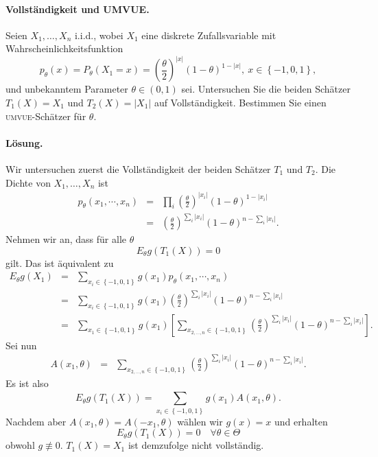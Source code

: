 \paragraph{Vollständigkeit und UMVUE. }  Seien $X_1,\ldots,X_n$ i.i.d.,
wobei $X_1$ eine diskrete Zufallsvariable mit Wahrscheinlichkeitsfunktion
\begin{equation}
	p_\theta(x)=P_\theta(X_1=x)= 
	\left( \frac{\theta}{2} \right)^{|x|} (1-\theta)^{1-|x|},\  
	x\in\left\{ -1,0,1 \right\},
\end{equation}
und unbekanntem Parameter $\theta\in (0,1)$ sei. Untersuchen Sie die beiden
Schätzer $T_1(X)=X_1$ und $T_2(X)=|X_1|$ auf Vollständigkeit. Bestimmen Sie
einen \textsc{umvue}-Schätzer für $\theta$.

\paragraph*{Lösung. } 
Wir untersuchen zuerst die Vollständigkeit der beiden Schätzer $T_1$ und $T_2$. 
Die Dichte von $X_1,\ldots,X_n$ ist
\begin{eqnarray}
	p_\theta(x_1, \cdots, x_n) &=& \prod_i \left( \frac{\theta}{2} \right)^{|x_i|} \left( 1-\theta \right)^{1-|x_i|} \\
	&=& \left( \frac{\theta}{2} \right)^{\sum_{i}^{} |x_i|} \left( 1-\theta \right)^{n-\sum_{i}^{} |x_i|}.
\end{eqnarray}
Nehmen wir an, dass für alle $\theta$
\begin{equation}
	E_\theta g\left( T_1\left( X \right) \right) = 0
\end{equation}
gilt. Das ist äquivalent zu 
\begin{eqnarray}
	E_\theta g\left( X_1 \right) &=&  \sum_{x_i\in\left\{ -1,0,1 \right\}}^{} g(x_1) p_\theta \left( x_1,\cdots,x_n \right) \\
	&=& \sum_{x_i\in\left\{ -1,0,1 \right\}}^{} g(x_1) \left( \frac{\theta}{2} \right)^{\sum_{i}^{} |x_i|} \left( 1-\theta \right)^{n-\sum_{i}^{} |x_i|} \\
	&=& \sum_{x_1\in\left\{ -1,0,1 \right\}}^{} g(x_1) \left[  \sum_{x_{2,\ldots,n}\in\left\{ -1,0,1 \right\}}^{}\left( \frac{\theta}{2} \right)^{\sum_{i}^{} |x_i|}\left( 1-\theta \right)^{n-\sum_{i}^{} |x_i|}   \right].
\end{eqnarray}
Sei nun
\begin{eqnarray}
	A(x_1, \theta) &=& \sum_{x_{2,\ldots,n}\in\left\{ -1,0,1 \right\}}^{}\left( \frac{\theta}{2} \right)^{\sum_{i}^{} |x_i|}\left( 1-\theta \right)^{n-\sum_{i}^{} |x_i|}.
\end{eqnarray}
Es ist also 
\begin{equation}
	E_\theta g\left( T_1\left( X \right) \right) = \sum_{x_i\in\left\{ -1,0,1 \right\}}^{} g(x_1) A\left( x_1, \theta \right).
\end{equation}
Nachdem aber $A\left( x_1,\theta \right) = A(-x_1,\theta)$ wählen wir $g\left( x \right)=x$ und erhalten
\begin{equation}
	E_\theta g\left( T_1\left( X \right) \right) = 0 \quad \forall \theta\in\Theta
\end{equation}
obwohl $g\nequiv 0$. $T_1(X)=X_1$ ist demzufolge nicht vollständig. 

